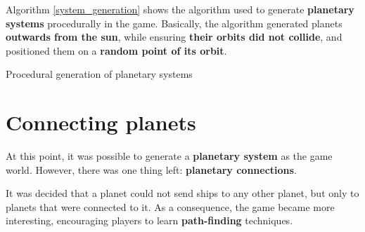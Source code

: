 \documentclass[a4paper,11pt,titlepage,abstract,numbers=noenddot,automark,mnsy,intlimits,rgb,dvipsnames]{report}
\begin{document}
Algorithm \autoref{system_generation} shows the algorithm used to generate \textbf{planetary systems} procedurally in the game.
Basically, the algorithm generated planets \textbf{outwards from the sun}, while ensuring \textbf{their orbits did not collide},
and positioned them on a \textbf{random point of its orbit}.
\begin{algorithm}
\caption{Procedural generation of planetary systems}
\label{system_generation}
\begin{algorithmic}
\ENDFOR
\end{algorithmic}
\end{algorithm}
\clearpage
\section{Connecting planets}
At this point, it was possible to generate a \textbf{planetary system} as the game world. However, there was one
thing left: \textbf{planetary connections}.

It was decided that a planet could not send ships to any other planet, but only to planets that were connected to it.
As a consequence, the game became more interesting, encouraging players to learn \textbf{path-finding} techniques.
\end{document}
